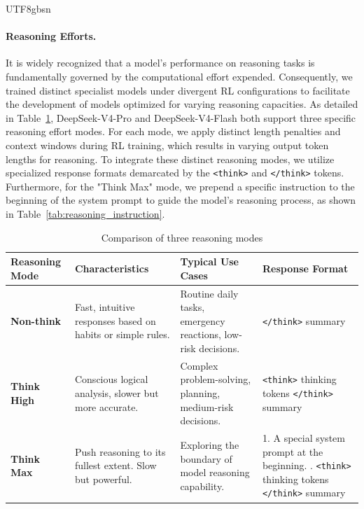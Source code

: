 \documentclass[11pt, a4paper, logo, copyright, nonumbering]{deepseek}
\newcommand{\dsvivp}{DeepSeek-V4-Pro}
\newcommand{\dsvivf}{DeepSeek-V4-Flash}
\begin{document}
\begin{CJK*}{UTF8}{gbsn}
\paragraph{Reasoning Efforts.} 
It is widely recognized that a model's performance on reasoning tasks is fundamentally governed by the computational effort expended. 
Consequently, we trained distinct specialist models under divergent RL configurations to facilitate the development of models optimized for varying reasoning capacities. 
As detailed in Table~\ref{tab:reasoning_modes}, \dsvivp{} and \dsvivf{} both support three specific reasoning effort modes. 
For each mode, we apply distinct length penalties and context windows during RL training, which results in varying output token lengths for reasoning.
To integrate these distinct reasoning modes, we utilize specialized response formats demarcated by the \texttt{<think>} and \texttt{</think>} tokens. 
Furthermore, for the "Think Max" mode, we prepend a specific instruction to the beginning of the system prompt to guide the model's reasoning process, as shown in Table~\ref{tab:reasoning_instruction}. 

\begin{table}[ht]
    \centering
    \caption{Comparison of three reasoning modes}
    \label{tab:reasoning_modes}
    \begin{tabular}{>{\raggedright\arraybackslash}p{2.5cm} p{3.5cm} p{3.5cm} p{3.5cm}}
    \toprule
    \textbf{Reasoning Mode} & \textbf{Characteristics} & \textbf{Typical Use Cases} & \textbf{Response Format} \\
    \midrule
    \textbf{Non-think} & 
    Fast, intuitive responses based on habits or simple rules. &
    Routine daily tasks, emergency reactions, low-risk decisions. &
     \texttt{</think>} summary \\
    \addlinespace
    \textbf{Think High} & 
    Conscious logical analysis, slower but more accurate. &
    Complex problem-solving, planning, medium-risk decisions. &
    \texttt{<think>} thinking tokens \texttt{</think>} summary\\
    \addlinespace
    \textbf{Think Max} & 
    Push reasoning to its fullest extent. Slow but powerful. &
    Exploring the boundary of model reasoning capability. &
    1. A special system prompt at the beginning. \newline 
     2. \texttt{<think>} thinking tokens \texttt{</think>} summary\\
    \bottomrule
    \end{tabular}
\end{table}


\end{CJK*}
\end{document}
